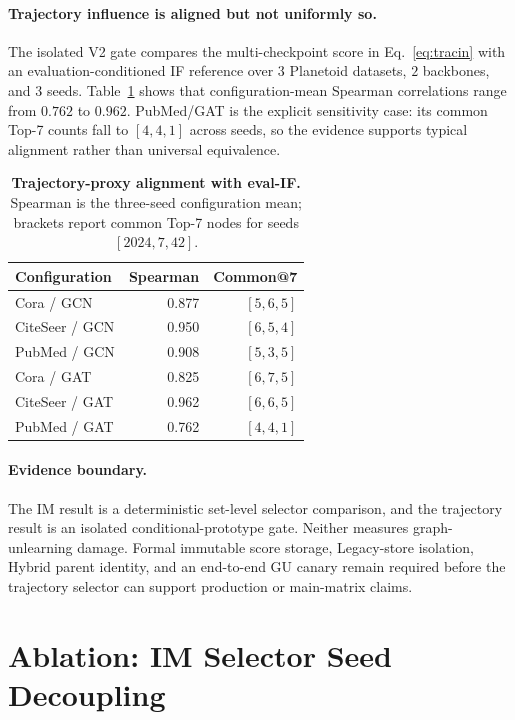 \paragraph{Trajectory influence is aligned but not uniformly so.}
The isolated V2 gate compares the multi-checkpoint score in
Eq.~\eqref{eq:tracin} with an evaluation-conditioned IF reference over
$3$ Planetoid datasets, $2$ backbones, and $3$ seeds.
Table~\ref{tab:tracin-v2-validity} shows that configuration-mean Spearman
correlations range from $0.762$ to $0.962$.  PubMed/GAT is the explicit
sensitivity case: its common Top-7 counts fall to $[4,4,1]$ across seeds, so
the evidence supports typical alignment rather than universal equivalence.

\begin{table}[h]
\centering
\small
\caption{\textbf{Trajectory-proxy alignment with eval-IF.} Spearman is the
three-seed configuration mean; brackets report common Top-7 nodes for seeds
$[2024,7,42]$.}
\label{tab:tracin-v2-validity}
\begin{tabular}{@{}lrr@{}}
\toprule
Configuration & Spearman & Common@7 \\
\midrule
Cora / GCN     & 0.877 & $[5,6,5]$ \\
CiteSeer / GCN & 0.950 & $[6,5,4]$ \\
PubMed / GCN   & 0.908 & $[5,3,5]$ \\
Cora / GAT     & 0.825 & $[6,7,5]$ \\
CiteSeer / GAT & 0.962 & $[6,6,5]$ \\
PubMed / GAT   & 0.762 & $[4,4,1]$ \\
\bottomrule
\end{tabular}
\end{table}

\paragraph{Evidence boundary.}
The IM result is a deterministic set-level selector comparison, and the
trajectory result is an isolated conditional-prototype gate.  Neither measures
graph-unlearning damage.  Formal immutable score storage, Legacy-store
isolation, Hybrid parent identity, and an end-to-end GU canary remain required
before the trajectory selector can support production or main-matrix claims.

\section{Ablation: IM Selector Seed Decoupling}
\label{app:imseed}


